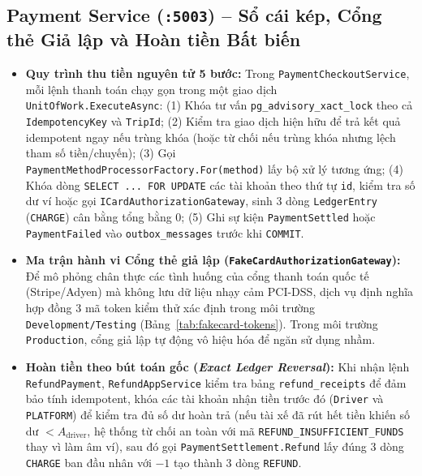 \documentclass[12pt,a4paper]{article}
\begin{document}
\subsection{Payment Service (\texttt{:5003}) -- Sổ cái kép, Cổng thẻ Giả lập và Hoàn tiền Bất biến}
\begin{itemize}[nosep]
    \item \textbf{Quy trình thu tiền nguyên tử 5 bước:} Trong \texttt{PaymentCheckoutService}, mỗi lệnh thanh toán chạy gọn trong một giao dịch \texttt{UnitOfWork.ExecuteAsync}: (1) Khóa tư vấn \texttt{pg\_advisory\_xact\_lock} theo cả \texttt{IdempotencyKey} và \texttt{TripId}; (2) Kiểm tra giao dịch hiện hữu để trả kết quả idempotent ngay nếu trùng khóa (hoặc từ chối nếu trùng khóa nhưng lệch tham số tiền/chuyến); (3) Gọi \texttt{PaymentMethodProcessorFactory.For(method)} lấy bộ xử lý tương ứng; (4) Khóa dòng \texttt{SELECT ... FOR UPDATE} các tài khoản theo thứ tự \texttt{id}, kiểm tra số dư ví hoặc gọi \texttt{ICardAuthorizationGateway}, sinh 3 dòng \texttt{LedgerEntry} (\texttt{CHARGE}) cân bằng tổng bằng $0$; (5) Ghi sự kiện \texttt{PaymentSettled} hoặc \texttt{PaymentFailed} vào \texttt{outbox\_messages} trước khi \texttt{COMMIT}.
    \item \textbf{Ma trận hành vi Cổng thẻ giả lập (\texttt{FakeCardAuthorizationGateway}):} Để mô phỏng chân thực các tình huống của cổng thanh toán quốc tế (Stripe/Adyen) mà không lưu dữ liệu nhạy cảm PCI-DSS, dịch vụ định nghĩa hợp đồng 3 mã token kiểm thử xác định trong môi trường \texttt{Development/Testing} (Bảng~\ref{tab:fakecard-tokens}). Trong môi trường \texttt{Production}, cổng giả lập tự động vô hiệu hóa để ngăn sử dụng nhầm.
    \item \textbf{Hoàn tiền theo bút toán gốc (\textit{Exact Ledger Reversal}):} Khi nhận lệnh \texttt{RefundPayment}, \texttt{RefundAppService} kiểm tra bảng \texttt{refund\_receipts} để đảm bảo tính idempotent, khóa các tài khoản nhận tiền trước đó (\texttt{Driver} và \texttt{PLATFORM}) để kiểm tra đủ số dư hoàn trả (nếu tài xế đã rút hết tiền khiến số dư $< A_{\text{driver}}$, hệ thống từ chối an toàn với mã \texttt{REFUND\_INSUFFICIENT\_FUNDS} thay vì làm âm ví), sau đó gọi \texttt{PaymentSettlement.Refund} lấy đúng 3 dòng \texttt{CHARGE} ban đầu nhân với $-1$ tạo thành 3 dòng \texttt{REFUND}.
\end{itemize}
\end{document}
